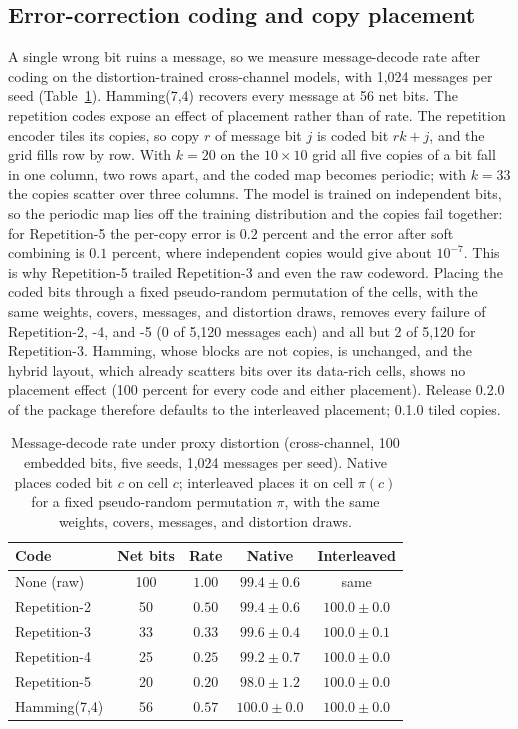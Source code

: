 \documentclass[conference]{IEEEtran}
\begin{document}
\subsection{Error-correction coding and copy placement}
\label{ssec:ecc_results}
A single wrong bit ruins a message, so we measure message-decode rate after coding on
the distortion-trained cross-channel models, with 1,024 messages per seed
(Table~\ref{tab:ecc}). Hamming(7,4) recovers every message at 56 net bits. The
repetition codes expose an effect of placement rather than of rate. The repetition
encoder tiles its copies, so copy $r$ of message bit $j$ is coded bit $rk+j$, and the
grid fills row by row. With $k=20$ on the $10\times10$ grid all five copies of a bit fall
in one column, two rows apart, and the coded map becomes periodic; with $k=33$ the copies
scatter over three columns. The model is trained on independent bits, so the periodic
map lies off the training distribution and the copies fail together: for Repetition-5
the per-copy error is $0.2$ percent and the error after soft combining is $0.1$ percent,
where independent copies would give about $10^{-7}$. This is why Repetition-5 trailed
Repetition-3 and even the raw codeword. Placing the coded bits through a fixed
pseudo-random permutation of the cells, with the same weights, covers, messages, and
distortion draws, removes every failure of Repetition-2, -4, and -5 (0 of 5,120 messages
each) and all but 2 of 5,120 for Repetition-3. Hamming, whose blocks are not copies, is
unchanged, and the hybrid layout, which already scatters bits over its data-rich cells,
shows no placement effect (100 percent for every code and either placement). Release
0.2.0 of the package therefore defaults to the interleaved placement; 0.1.0 tiled copies.

\begin{table}[t]
\centering
\caption{Message-decode rate under proxy distortion (cross-channel, 100 embedded bits,
five seeds, 1,024 messages per seed). Native places coded bit $c$ on cell $c$;
interleaved places it on cell $\pi(c)$ for a fixed pseudo-random permutation $\pi$, with
the same weights, covers, messages, and distortion draws.}
\label{tab:ecc}
\begin{tabular}{lcccc}
\toprule
Code & Net bits & Rate & Native & Interleaved \\
\midrule
None (raw)    & 100 & $1.00$ & $99.4\pm0.6$  & same \\
Repetition-2  & 50  & $0.50$ & $99.4\pm0.6$  & $100.0\pm0.0$ \\
Repetition-3  & 33  & $0.33$ & $99.6\pm0.4$  & $100.0\pm0.1$ \\
Repetition-4  & 25  & $0.25$ & $99.2\pm0.7$  & $100.0\pm0.0$ \\
Repetition-5  & 20  & $0.20$ & $98.0\pm1.2$  & $100.0\pm0.0$ \\
Hamming(7,4)  & 56  & $0.57$ & $100.0\pm0.0$ & $100.0\pm0.0$ \\
\bottomrule
\end{tabular}
\end{table}
\end{document}
